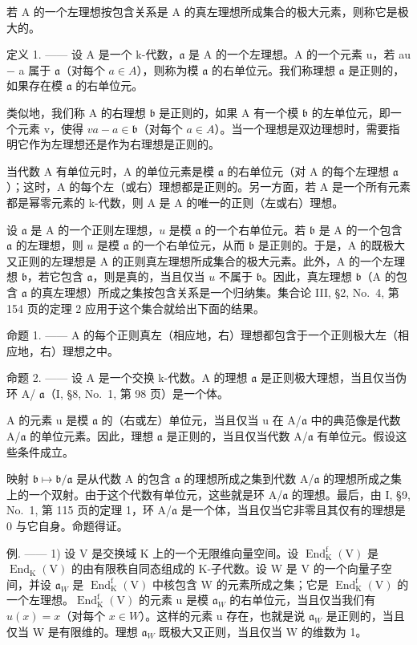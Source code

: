 若 A 的一个左理想按包含关系是 A 的真左理想所成集合的极大元素，则称它是极大的。

定义 1. —— 设 A 是一个 k-代数，\(\mathfrak{a}\) 是 A 的一个左理想。A 的一个元素 u，若 au − a 属于 \(\mathfrak{a}\)（对每个 \(a \in A\)），则称为模 \(\mathfrak{a}\) 的右单位元。我们称理想 \(\mathfrak{a}\) 是正则的，如果存在模 \(\mathfrak{a}\) 的右单位元。

类似地，我们称 A 的右理想 \(\mathfrak{b}\) 是正则的，如果 A 有一个模 \(\mathfrak{b}\) 的左单位元，即一个元素 v，使得 \(va - a \in \mathfrak{b}\)（对每个 \(a \in A\)）。当一个理想是双边理想时，需要指明它作为左理想还是作为右理想是正则的。

当代数 A 有单位元时，A 的单位元素是模 \(\mathfrak{a}\) 的右单位元（对 A 的每个左理想 \(\mathfrak{a}\)）；这时，A 的每个左（或右）理想都是正则的。另一方面，若 A 是一个所有元素都是幂零元素的 k-代数，则 A 是 A 的唯一的正则（左或右）理想。

设 \(\mathfrak{a}\) 是 A 的一个正则左理想，\(u\) 是模 \(\mathfrak{a}\) 的一个右单位元。若 \(\mathfrak{b}\) 是 A 的一个包含 \(\mathfrak{a}\) 的左理想，则 \(u\) 是模 \(\mathfrak{a}\) 的一个右单位元，从而 \(\mathfrak{b}\) 是正则的。于是，A 的既极大又正则的左理想是 A 的正则真左理想所成集合的极大元素。此外，A 的一个左理想 \(\mathfrak{b}\)，若它包含 \(\mathfrak{a}\)，则是真的，当且仅当 \(u\) 不属于 \(\mathfrak{b}\)。因此，真左理想 \(\mathfrak{b}\)（A 的包含 \(\mathfrak{a}\) 的真左理想）所成之集按包含关系是一个归纳集。集合论 III, §2, No.~4, 第 154 页的定理 2 应用于这个集合就给出下面的结果。

命题 1. —— A 的每个正则真左（相应地，右）理想都包含于一个正则极大左（相应地，右）理想之中。

命题 2. —— 设 A 是一个交换 k-代数。A 的理想 \(\mathfrak{a}\) 是正则极大理想，当且仅当伪环 A/ \(\mathfrak{a}\)（I, §8, No.~1, 第 98 页）是一个体。

A 的元素 u 是模 \(\mathfrak{a}\) 的（右或左）单位元，当且仅当 u 在 A/\(\mathfrak{a}\) 中的典范像是代数 A/\(\mathfrak{a}\) 的单位元素。因此，理想 \(\mathfrak{a}\) 是正则的，当且仅当代数 A/\(\mathfrak{a}\) 有单位元。假设这些条件成立。

映射 \(\mathfrak{b} \mapsto \mathfrak{b}/\mathfrak{a}\) 是从代数 A 的包含 \(\mathfrak{a}\) 的理想所成之集到代数 A/\(\mathfrak{a}\) 的理想所成之集上的一个双射。由于这个代数有单位元，这些就是环 A/\(\mathfrak{a}\) 的理想。最后，由 I, §9, No.~1, 第 115 页的定理 1，环 A/\(\mathfrak{a}\) 是一个体，当且仅当它非零且其仅有的理想是 0 与它自身。命题得证。

例. —— 1) 设 V 是交换域 K 上的一个无限维向量空间。设 \(\operatorname{End}_{\mathrm{K}}^{\mathrm{f}}(\mathrm{V})\) 是 \(\operatorname{End}_{\mathrm{K}}(\mathrm{V})\) 的由有限秩自同态组成的 K-子代数。设 W 是 V 的一个向量子空间，并设 \(\mathfrak{a}_{W}\) 是 \(\operatorname{End}_{\mathrm{K}}^{\mathrm{f}}(\mathrm{V})\) 中核包含 W 的元素所成之集；它是 \(\operatorname{End}_{\mathrm{K}}^{\mathrm{f}}(\mathrm{V})\) 的一个左理想。\(\operatorname{End}_{\mathrm{K}}^{\mathrm{f}}(\mathrm{V})\) 的元素 u 是模 \(\mathfrak{a}_{W}\) 的右单位元，当且仅当我们有 \(u(x)=x\)（对每个 \(x\in W\)）。这样的元素 u 存在，也就是说 \(\mathfrak{a}_{W}\) 是正则的，当且仅当 W 是有限维的。理想 \(\mathfrak{a}_{W}\) 既极大又正则，当且仅当 W 的维数为 1。

